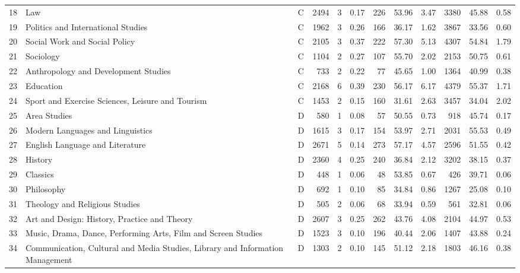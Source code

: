\begin{tabular}{rllrrrrrrrrr}
18 & Law & C & 2494 & 3 & 0.17 & 226 & 53.96 & 3.47 & 3380 & 45.88 & 0.58 \\
19 & Politics and International Studies & C & 1962 & 3 & 0.26 & 166 & 36.17 & 1.62 & 3867 & 33.56 & 0.60 \\
20 & Social Work and Social Policy & C & 2105 & 3 & 0.37 & 222 & 57.30 & 5.13 & 4307 & 54.84 & 1.79 \\
21 & Sociology & C & 1104 & 2 & 0.27 & 107 & 55.70 & 2.02 & 2153 & 50.75 & 0.61 \\
22 & Anthropology and Development Studies & C & 733 & 2 & 0.22 & 77 & 45.65 & 1.00 & 1364 & 40.99 & 0.38 \\
23 & Education & C & 2168 & 6 & 0.39 & 230 & 56.17 & 6.17 & 4379 & 55.37 & 1.71 \\
24 & Sport and Exercise Sciences, Leisure and Tourism & C & 1453 & 2 & 0.15 & 160 & 31.61 & 2.63 & 3457 & 34.04 & 2.02 \\
25 & Area Studies & D & 580 & 1 & 0.08 & 57 & 50.55 & 0.73 & 918 & 45.74 & 0.17 \\
26 & Modern Languages and Linguistics & D & 1615 & 3 & 0.17 & 154 & 53.97 & 2.71 & 2031 & 55.53 & 0.49 \\
27 & English Language and Literature & D & 2671 & 5 & 0.14 & 273 & 57.17 & 4.57 & 2596 & 51.55 & 0.42 \\
28 & History & D & 2360 & 4 & 0.25 & 240 & 36.84 & 2.12 & 3202 & 38.15 & 0.37 \\
29 & Classics & D & 448 & 1 & 0.06 & 48 & 53.85 & 0.67 & 426 & 39.71 & 0.06 \\
30 & Philosophy & D & 692 & 1 & 0.10 & 85 & 34.84 & 0.86 & 1267 & 25.08 & 0.10 \\
31 & Theology and Religious Studies & D & 505 & 2 & 0.06 & 68 & 33.94 & 0.59 & 561 & 32.81 & 0.06 \\
32 & Art and Design: History, Practice and Theory & D & 2607 & 3 & 0.25 & 262 & 43.76 & 4.08 & 2104 & 44.97 & 0.53 \\
33 & Music, Drama, Dance, Performing Arts, Film and Screen Studies & D & 1523 & 3 & 0.10 & 196 & 40.44 & 2.06 & 1407 & 43.88 & 0.24 \\
34 & Communication, Cultural and Media Studies, Library and Information Management & D & 1303 & 2 & 0.10 & 145 & 51.12 & 2.18 & 1803 & 46.16 & 0.38 \\
\bottomrule
\end{tabular}
